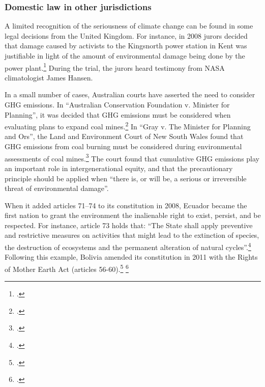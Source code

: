 		\subsubsection{Domestic law in other jurisdictions}
		\label{sec:IntlDomesticLaw}
		
		
A limited recognition of the seriousness of climate change can be found in some legal decisions from the United Kingdom.
For instance, in 2008 jurors decided that damage caused by activists to the Kingsnorth power station in Kent was justifiable in light of the amount of environmental damage being done by the power plant.\footcite[][]{JuryDecides}
During the trial, the jurors heard testimony from NASA climatologist James Hansen.



In a small number of cases, Australian courts have asserted the need to consider GHG emissions.
In ``Australian Conservation Foundation v. Minister for Planning'', it was decided that GHG emissions must be considered when evaluating plans to expand coal mines.\footcite[][]{ACFvPlanning}
In ``Gray v. The Minister for Planning and Ors'', the Land and Environment Court of New South Wales found that GHG emissions from coal burning must be considered during environmental assessments of coal mines.\footcite[][]{GrayvPlanning}
The court found that cumulative GHG emissions play an important role in intergenerational equity, and that the precautionary principle should be applied when ``there is, or will be, a serious or irreversible threat of environmental damage''.



When it added articles 71--74 to its constitution in 2008, Ecuador became the first nation to grant the environment the inalienable right to exist, persist, and be respected.
For instance, article 73 holds that: ``The State shall apply preventive and restrictive measures on activities that might lead to the extinction of species, the destruction of ecosystems and the permanent alteration of natural cycles''.\footcite[][]{EcuadorConstitution}
Following this example, Bolivia amended its constitution in 2011 with the Rights of Mother Earth Act (articles 56-60).\footcite[][p. 28--29]{BoliviaConstitution} \footcite[][]{BoliviaGives}



